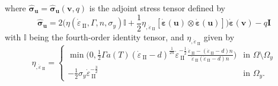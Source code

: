 \documentclass[12pt]{article}
\newcommand{\IIinv}{{\dot\varepsilon}_{\mathrm{\!\!\:II}}}
\newcommand{\uu}{{\ensuremath{\boldsymbol{u}}}}
\newcommand{\vv}{{\ensuremath{\boldsymbol{v}}}}
\newcommand{\ssigma}{{\ensuremath{\boldsymbol{\sigma}}}}
\newcommand{\strain}{{\ensuremath{\dot{\boldsymbol{\varepsilon}}}}}
\begin{document}
where $\hat\ssigma_\uu = \hat\ssigma_\uu(\vv,q)$ is the adjoint stress
tensor defined by
\begin{equation}\label{eq:sigma_hat}
\hat\ssigma_\uu  = 2 \Big(\eta(\IIinv,\Gamma, n,
\sigma_y)\mathbb{I}+\frac{1}{2} \eta_{,\IIinv} [\strain(\uu)\otimes
      \strain(\uu)]\Big)\strain(\vv) -q\textbf{I}
\end{equation}
with $\mathbb{I}$ being the fourth-order identity tensor, and
$\eta_{,\IIinv}$ given by
\begin{equation}
  \eta_{,\IIinv} \!\!=\!\!
  \begin{cases}
   \min\!\Big(0, \frac{1}{2}\Gamma
   a(T)(\IIinv-d)^{\frac{1}{2n}}\IIinv^{-\frac{1}{2}}\frac{\IIinv-(\IIinv-d)n}{\IIinv(\IIinv-d)n}\Big)
   &\text{in } \Omega\setminus\Omega_y 
   \\
   -\frac{1}{2}\sigma_{y}\IIinv^{-\frac{3}{2}}  &\text{in } \Omega_y.
  \end{cases}
\end{equation}
\end{document}

